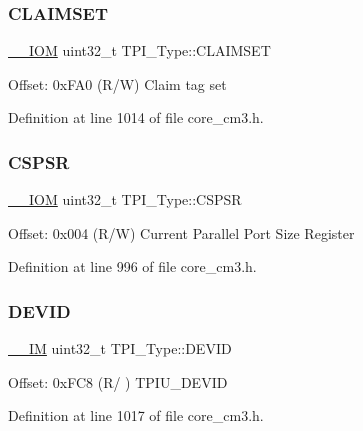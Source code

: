 \subsubsection{\texorpdfstring{C\+L\+A\+I\+M\+S\+ET}{CLAIMSET}}
{\footnotesize\ttfamily \hyperlink{core__sc300_8h_ab6caba5853a60a17e8e04499b52bf691}{\+\_\+\+\_\+\+I\+OM} uint32\+\_\+t T\+P\+I\+\_\+\+Type\+::\+C\+L\+A\+I\+M\+S\+ET}

Offset\+: 0x\+F\+A0 (R/W) Claim tag set 

Definition at line 1014 of file core\+\_\+cm3.\+h.

\mbox{\label{struct_t_p_i___type_a8826aa84e5806053395a742d38d59d0f}} 
\subsubsection{\texorpdfstring{C\+S\+P\+SR}{CSPSR}}
{\footnotesize\ttfamily \hyperlink{core__sc300_8h_ab6caba5853a60a17e8e04499b52bf691}{\+\_\+\+\_\+\+I\+OM} uint32\+\_\+t T\+P\+I\+\_\+\+Type\+::\+C\+S\+P\+SR}

Offset\+: 0x004 (R/W) Current Parallel Port Size Register 

Definition at line 996 of file core\+\_\+cm3.\+h.

\mbox{\label{struct_t_p_i___type_abc0ecda8a5446bc754080276bad77514}} 
\subsubsection{\texorpdfstring{D\+E\+V\+ID}{DEVID}}
{\footnotesize\ttfamily \hyperlink{core__sc300_8h_a4cc1649793116d7c2d8afce7a4ffce43}{\+\_\+\+\_\+\+IM} uint32\+\_\+t T\+P\+I\+\_\+\+Type\+::\+D\+E\+V\+ID}

Offset\+: 0x\+F\+C8 (R/ ) T\+P\+I\+U\+\_\+\+D\+E\+V\+ID 

Definition at line 1017 of file core\+\_\+cm3.\+h.

\mbox{\label{struct_t_p_i___type_ad98855854a719bbea33061e71529a472}} 

